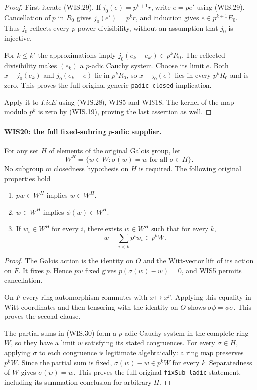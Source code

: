 \begin{proof}
First iterate (WIS.29). If $j_0(e)=p^{k+1}r$,
write $e=pe'$ using (WIS.29). Cancellation of $p$
in $R_0$ gives $j_0(e')=p^kr$, and induction gives
$e\in p^{k+1}E_0$. Thus $j_0$ reflects every
$p$-power divisibility, without an assumption that
$j_0$ is injective.

For $k\leq k'$ the approximations imply
$j_0(e_k-e_{k'})\in p^kR_0$. The reflected
divisibility makes $(e_k)$ a $p$-adic Cauchy system.
Choose its limit $e$. Both
$x-j_0(e_k)$ and $j_0(e_k-e)$ lie in $p^kR_0$,
so $x-j_0(e)$ lies in every $p^kR_0$ and is zero.
This proves the full original generic
\texttt{padic\_closed} implication.

Apply it to $I.ioE$ using (WIS.28), WIS5 and WIS18.
The kernel of the map modulo $p^k$ is zero by
(WIS.19), proving the last assertion as well.
\end{proof}

\paragraph{WIS20: the full fixed-subring $p$-adic supplier.}
\label{claim:WIS20}
For any set $H$ of elements of the original Galois group, let
\[
             W^H=\{w\in W:\sigma(w)=w\text{ for all }\sigma\in H\}.
\]
No subgroup or closedness hypothesis on $H$ is required.
The following original properties hold:
\begin{enumerate}
\item $pw\in W^H$ implies $w\in W^H$.
\item $w\in W^H$ implies $\phi(w)\in W^H$.
\item If $w_i\in W^H$ for every $i$, there exists $w\in W^H$
      such that for every $k$,
      \[
                  w-\sum_{i<k}p^iw_i\in p^kW.             \tag{WIS.30}
      \]
\end{enumerate}

\begin{proof}
The Galois action is the identity on $O$ and the
Witt-vector lift of its action on $F$.
It fixes $p$. Hence $pw$ fixed gives
$p(\sigma(w)-w)=0$, and WIS5 permits cancellation.

On $F$ every ring automorphism commutes with $x\mapsto x^p$.
Applying this equality in Witt coordinates and then
tensoring with the identity on $O$ shows
$\sigma\phi=\phi\sigma$. This proves the second clause.

The partial sums in (WIS.30) form a $p$-adic Cauchy
system in the complete ring $W$, so they have a
limit $w$ satisfying its stated congruences.
For every $\sigma\in H$, applying $\sigma$ to each
congruence is legitimate algebraically: a ring map
preserves $p^kW$. Since the partial sum is fixed,
$\sigma(w)-w\in p^kW$ for every $k$.
Separatedness of $W$ gives $\sigma(w)=w$.
This proves the full original
\texttt{fixSub\_ladic} statement, including its
summation conclusion for arbitrary $H$.
\end{proof}

